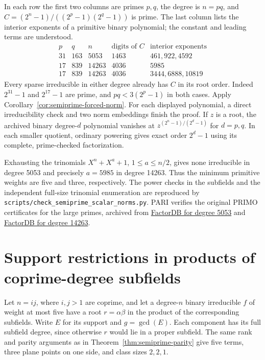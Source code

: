 \documentclass[11pt]{article}
\begin{document}
In each row the first two columns are primes \(p,q\), the degree is
\(n=pq\), and \(C=(2^n-1)/((2^p-1)(2^q-1))\) is prime. The last column
lists the interior exponents of a primitive binary polynomial; the
constant and leading terms are understood.
\[
\begin{array}{r|r|r|r|l}
 p&q&n&\text{digits of }C&\text{interior exponents}\\\hline
 31&163&5053&1463&461,922,4592\\
 17&839&14263&4036&5985\\
 17&839&14263&4036&3444,6888,10819
\end{array}
\]
Every sparse irreducible in either degree already has \(C\) in its
root order. Indeed \(2^{31}-1\) and \(2^{17}-1\) are prime, and
\(pq<3(2^p-1)\) in both cases. Apply
Corollary~\ref{cor:semiprime-forced-norm}.
For each displayed polynomial, a direct irreducibility check and two
norm embeddings finish the proof. If \(z\) is a root, the archived
binary degree-\(d\) polynomial vanishes at
\(z^{(2^n-1)/(2^d-1)}\) for \(d=p,q\).
In each smaller quotient, ordinary powering gives exact order
\(2^d-1\) using its complete, prime-checked factorization.

Exhausting the trinomials \(X^n+X^a+1\), \(1\le a\le n/2\), gives none
irreducible in degree 5053 and precisely \(a=5985\) in degree 14263.
Thus the minimum primitive weights are five and three, respectively.
The power checks in the subfields and the independent full-size
trinomial enumeration are reproduced by
\nolinkurl{scripts/check_semiprime_scalar_norms.py}. PARI verifies
the original PRIMO certificates for the large primes, archived from
\href{https://factordb.com/cert/1100000000001997225}{FactorDB for degree 5053} and
\href{https://factordb.com/cert/1100000000005636398}{FactorDB for degree 14263}.

\clearpage
\section{Support restrictions in products of coprime-degree subfields}
\label{sec:scalar-support}
Let \(n=ij\), where \(i,j>1\) are coprime, and let a degree-\(n\)
binary irreducible \(f\) of weight at most five have a root
\(r=\alpha\beta\) in the product of the corresponding subfields.
Write \(E\) for its support and \(g=\gcd(E)\). Each component has its
full subfield degree, since otherwise \(r\) would lie in a proper
subfield. The same rank and parity arguments as in
Theorem~\ref{thm:semiprime-parity} give five terms, three plane
points on one side, and class sizes \(2,2,1\).
\end{document}

